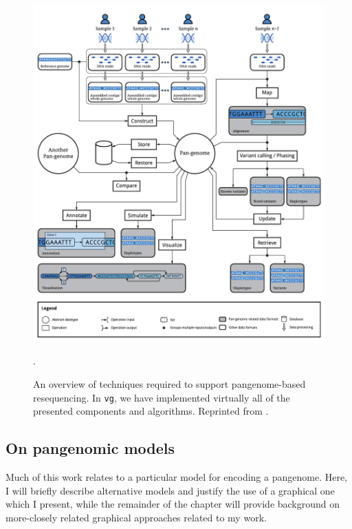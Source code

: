 \begin{figure}[htbp!]
  \centering
  \includegraphics[width=1.0\textwidth]{Chapter1/Figs/cpang_fig2.pdf}
  \caption[Computational pangenomics]{
    An overview of techniques required to support pangenome-based resequencing.
    In {\tt vg}, we have implemented virtually all of the presented components and algorithms.
    Reprinted from \cite{computational2016computational}.
    } 
\label{fig:pangenomic_processes}.
\end{figure}



\subsection{On pangenomic models}

\label{sec:on_pangenomic_models}

Much of this work relates to a particular model for encoding a pangenome.
Here, I will briefly describe alternative models and justify the use of a graphical one which I present, while the remainder of the chapter will provide background on more-closely related graphical approaches related to my work.

